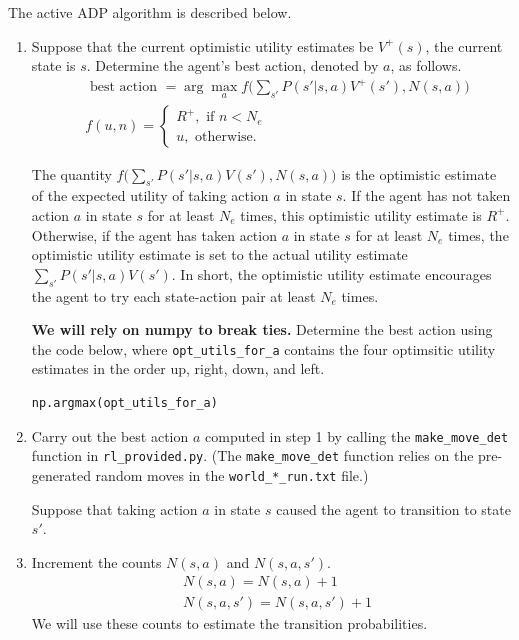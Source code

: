 \documentclass[12pt]{article}
\begin{document}
The active ADP algorithm is described below.
\begin{enumerate}

\item 
Suppose that the current optimistic utility estimates be $V^+(s)$, the current state is $s$. Determine the agent's best action, denoted by $a$, as follows. 
%
\begin{align}
& \text{ best action } = \arg\max_a f \bigg( \sum_{s'} P(s'|s,a) V^+(s'), N(s,a) \bigg) \\
& f(u,n) = 
\begin{cases}
R^+, \text{ if } n < N_e \\
u, \text{ otherwise.}
\end{cases}
\end{align}

The quantity $f \bigg( \sum_{s'} P(s'|s,a) V(s'), N(s,a) \bigg)$ is the optimistic estimate of the expected utility of taking action $a$ in state $s$. 
%
If the agent has not taken action $a$ in state $s$ for at least $N_e$ times, this optimistic utility estimate is $R^+$. Otherwise, if the agent has taken action $a$ in state $s$ for at least $N_e$ times, the optimistic utility estimate is set to the actual utility estimate $\sum_{s'} P(s'|s,a) V(s')$.
%
In short, the optimistic utility estimate encourages the agent to try each state-action pair at least $N_e$ times.

{\bf We will rely on numpy to break ties.} Determine the best action using the code below, where \verb+opt_utils_for_a+ contains the four optimsitic utility estimates in the order up, right, down, and left.
\begin{verbatim}
np.argmax(opt_utils_for_a)    
\end{verbatim}

\item 
Carry out the best action $a$ computed in step 1 by calling the \verb+make_move_det+ function in \verb+rl_provided.py+. (The \verb+make_move_det+ function relies on the pre-generated random moves in the \verb+world_*_run.txt+ file.)

Suppose that taking action $a$ in state $s$ caused the agent to transition to state $s'$.

\item 
Increment the counts $N(s,a)$ and $N(s,a,s')$.
\begin{align*}
& N(s,a) = N(s,a) + 1 \\
& N(s,a,s') = N(s,a,s') + 1
\end{align*}
We will use these counts to estimate the transition probabilities.


\end{enumerate}
\end{document}
